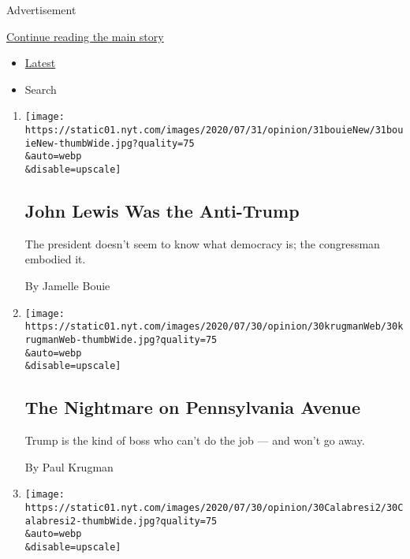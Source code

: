 Advertisement

\protect\hyperlink{after-mid1}{Continue reading the main story}

\begin{itemize}
\tightlist
\item
  \protect\hyperlink{stream-panel}{Latest}
\item
  Search
\end{itemize}

\begin{enumerate}
\def\labelenumi{\arabic{enumi}.}
\item
  \href{/2020/07/31/opinion/sunday/john-lewis-trump-election-2020.html}{}

  \texttt{[image: https://static01.nyt.com/images/2020/07/31/opinion/31bouieNew/31bouieNew-thumbWide.jpg?quality=75\\\&auto=webp\\\&disable=upscale]}

  \hypertarget{john-lewis-was-the-anti-trump}{%
  \subsection{John Lewis Was the
  Anti-Trump}\label{john-lewis-was-the-anti-trump}}

  The president doesn't seem to know what democracy is; the congressman
  embodied it.

  By Jamelle Bouie
\item
  \href{/2020/07/30/opinion/trump-coronavirus-economy.html}{}

  \texttt{[image: https://static01.nyt.com/images/2020/07/30/opinion/30krugmanWeb/30krugmanWeb-thumbWide.jpg?quality=75\\\&auto=webp\\\&disable=upscale]}

  \hypertarget{the-nightmare-on-pennsylvania-avenue}{%
  \subsection{The Nightmare on Pennsylvania
  Avenue}\label{the-nightmare-on-pennsylvania-avenue}}

  Trump is the kind of boss who can't do the job --- and won't go away.

  By Paul Krugman
\item
  \href{/2020/07/30/opinion/trump-delay-election-coronavirus.html}{}

  \texttt{[image: https://static01.nyt.com/images/2020/07/30/opinion/30Calabresi2/30Calabresi2-thumbWide.jpg?quality=75\\\&auto=webp\\\&disable=upscale]}

  \hypertarget{trump-might-try-to-postpone-the-election-thats-unconstitutional}{%
}
\end{enumerate}

